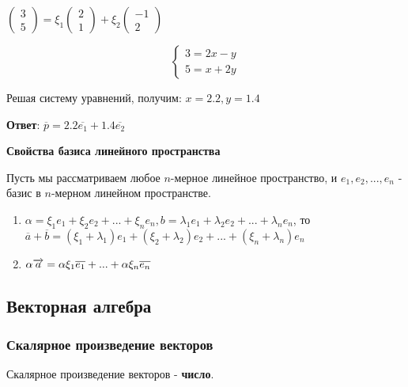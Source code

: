 \documentclass{article}
\def\vec{\ensuremath\overrightarrow}
\begin{document}
\begin{flushleft}
$\begin{pmatrix}
    3 \\
    5
\end{pmatrix} = \xi_1 \begin{pmatrix}
    2 \\
    1
\end{pmatrix} + \xi_2 \begin{pmatrix}
    -1 \\
    2
\end{pmatrix}$

\begin{equation}
    \begin{cases}
        3 = 2x - y \\
        5 = x + 2y
    \end{cases}
\end{equation}

Решая систему уравнений, получим: $x = 2.2, y = 1.4$

\hfill

\textbf{Ответ}: $\overline{p} = 2.2 \overline{e_1} + 1.4 \overline{e_2}$

\hfill

\textbf{Свойства базиса линейного пространства}

Пусть мы рассматриваем любое $n$-мерное линейное пространство, и $e_1, e_2, ..., e_n$ - базис в $n$-мерном линейном пространстве.

\begin{enumerate}
    \item $\alpha = \xi_1 e_1 + \xi_2 e_2 + ... + \xi_n e_n, b = \lambda_1 e_1 + \lambda_2 e_2 + ... + \lambda_n e_n$, то $\overline{a} + \overline{b} = (\xi_1 + \lambda_1) e_1 + (\xi_2 + \lambda_2) e_2 + ... + (\xi_n + \lambda_n) e_n$
    \item $\alpha \vec{a} = \alpha \xi_1 \overline{e_1} + ... + \alpha \xi_n \overline{e_n}$
\end{enumerate}

\pagebreak
\subsection{Векторная алгебра}

\subsubsection{Скалярное произведение векторов}

Скалярное произведение векторов - \textbf{число}.


\end{flushleft}
\end{document}
